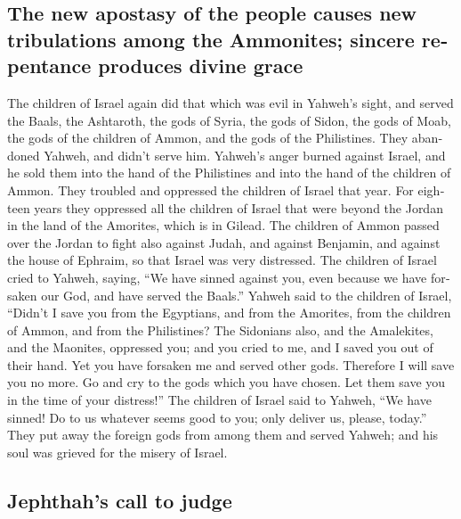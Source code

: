 \begin{paracol}{2}
\begin{otherlanguage}{english}
\hypertarget{the-new-apostasy-of-the-people-causes-new-tribulations-among-the-ammonites-sincere-repentance-produces-divine-grace}{%
\subsection{The new apostasy of the people causes new tribulations among
the Ammonites; sincere repentance produces divine
grace}\label{the-new-apostasy-of-the-people-causes-new-tribulations-among-the-ammonites-sincere-repentance-produces-divine-grace}}

 The children of Israel again did that which was evil in
Yahweh's sight, and served the Baals, the Ashtaroth, the gods of Syria,
the gods of Sidon, the gods of Moab, the gods of the children of Ammon,
and the gods of the Philistines. They abandoned Yahweh, and didn't serve
him.  Yahweh's anger burned against Israel, and he sold
them into the hand of the Philistines and into the hand of the children
of Ammon.  They troubled and oppressed the children of
Israel that year. For eighteen years they oppressed all the children of
Israel that were beyond the Jordan in the land of the Amorites, which is
in Gilead.  The children of Ammon passed over the Jordan
to fight also against Judah, and against Benjamin, and against the house
of Ephraim, so that Israel was very distressed.  The
children of Israel cried to Yahweh, saying, ``We have sinned against
you, even because we have forsaken our God, and have served the Baals.''
 Yahweh said to the children of Israel, ``Didn't I save
you from the Egyptians, and from the Amorites, from the children of
Ammon, and from the Philistines?  The Sidonians also, and
the Amalekites, and the Maonites, oppressed you; and you cried to me,
and I saved you out of their hand.  Yet you have forsaken
me and served other gods. Therefore I will save you no more.
 Go and cry to the gods which you have chosen. Let them
save you in the time of your distress!''  The children of
Israel said to Yahweh, ``We have sinned! Do to us whatever seems good to
you; only deliver us, please, today.''  They put away the
foreign gods from among them and served Yahweh; and his soul was grieved
for the misery of Israel.

\hypertarget{jephthahs-call-to-judge}{%
\subsection{Jephthah's call to judge}\label{jephthahs-call-to-judge}}


\end{otherlanguage}
\end{paracol}
